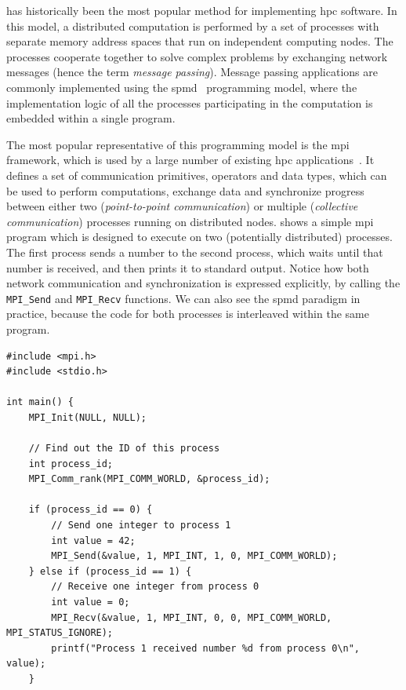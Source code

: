 \begin{description}[wide=0pt]
	\item[Message passing] has historically been the most popular method for implementing \gls{hpc} software. In
		this model, a distributed computation is performed by a set of processes with separate memory
		address spaces that run on independent computing nodes. The processes cooperate together to
		solve complex problems by exchanging network messages (hence the term \emph{message passing}).
		Message passing applications are commonly implemented using the
		\gls{spmd}~\cite{spmd} programming model, where the implementation logic of
		all the processes participating in the computation is embedded within a single program.

		The most popular representative of this programming model is the
		\gls{mpi}~\cite{mpi} framework, which is used by a large number of
		existing \gls{hpc} applications~\cite{mpiusagestudy2}. It defines a set of
		communication primitives, operators and data types, which can be used to perform computations,
		exchange data and synchronize progress between either two (\emph{point-to-point communication}) or multiple
		(\emph{collective communication}) processes running on distributed nodes.  shows a
		simple \gls{mpi} program which is designed to execute on two (potentially distributed)
		processes. The first process sends a number to the second process, which waits until that number is
		received, and then prints it to standard output. Notice how both network communication and
		synchronization is expressed explicitly, by calling the \texttt{MPI\_Send} and
		\texttt{MPI\_Recv} functions. We can also see the \gls{spmd} paradigm in practice,
		because the code for both processes is interleaved within the same program.

		\begin{listing}[h]
			\begin{verbatim}
#include <mpi.h>
#include <stdio.h>

int main() {
	MPI_Init(NULL, NULL);

	// Find out the ID of this process
	int process_id;
	MPI_Comm_rank(MPI_COMM_WORLD, &process_id);

	if (process_id == 0) {
		// Send one integer to process 1
		int value = 42;
		MPI_Send(&value, 1, MPI_INT, 1, 0, MPI_COMM_WORLD);
	} else if (process_id == 1) {
		// Receive one integer from process 0
		int value = 0;
		MPI_Recv(&value, 1, MPI_INT, 0, 0, MPI_COMM_WORLD, MPI_STATUS_IGNORE);
		printf("Process 1 received number %d from process 0\n", value);
	}


\end{verbatim}
\end{listing}
\end{description}
